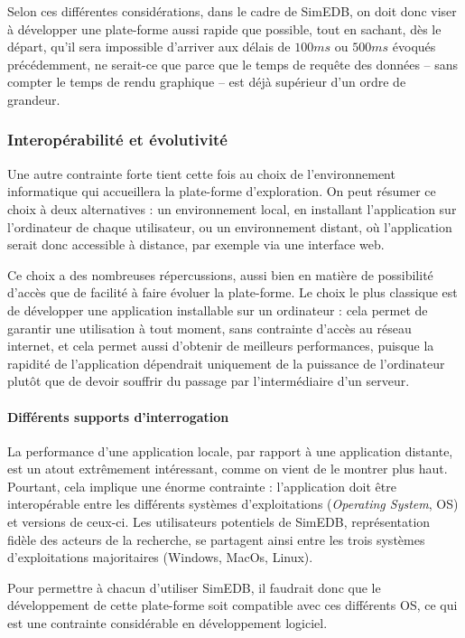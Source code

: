 		Selon ces différentes considérations, dans le cadre de SimEDB, on doit donc viser à développer une plate-forme aussi rapide que possible, tout en sachant, dès le départ, qu'il sera impossible d'arriver aux délais de $100ms$ ou $500ms$ évoqués précédemment, ne serait-ce que parce que le temps de requête des données -- sans compter le temps de rendu graphique -- est déjà supérieur d'un ordre de grandeur.

		\subsubsection{Interopérabilité et évolutivité}
		
		Une autre contrainte forte tient cette fois au choix de l'environnement informatique qui accueillera la plate-forme d'exploration.
		On peut résumer ce choix à deux alternatives : un environnement local, en installant l'application sur l'ordinateur de chaque utilisateur, ou un environnement distant, où l'application serait donc accessible à distance, par exemple via une interface web.
		
		Ce choix a des nombreuses répercussions, aussi bien en matière de possibilité d'accès que de facilité à faire évoluer la plate-forme.
		Le choix le plus classique est de développer une application installable sur un ordinateur : cela permet de garantir une utilisation à tout moment, sans contrainte d'accès au réseau internet, et cela permet aussi d'obtenir de meilleurs performances, puisque la rapidité de l'application dépendrait uniquement de la puissance de l'ordinateur plutôt que de devoir souffrir du passage par l'intermédiaire d'un serveur.
		
		\paragraph*{Différents supports d'interrogation}
		La performance d'une application locale, par rapport à une application distante, est un atout extrêmement intéressant, comme on vient de le montrer plus haut.
		Pourtant, cela implique une énorme contrainte : l'application doit être interopérable entre les différents systèmes d'exploitations (\textit{Operating System}, OS) et versions de ceux-ci.
		Les utilisateurs potentiels de SimEDB, représentation fidèle des acteurs de la recherche, se partagent ainsi entre les trois systèmes d'exploitations majoritaires (Windows, MacOs, Linux).
		
		Pour permettre à chacun d'utiliser SimEDB, il faudrait donc que le développement de cette plate-forme soit compatible avec ces différents OS, ce qui est une contrainte considérable en développement logiciel.
		

